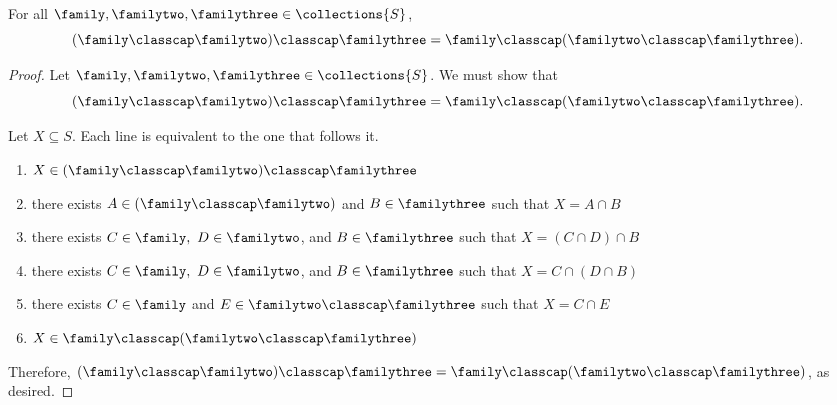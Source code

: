 \begin{theorem}
    \label{thm_classcap_associative}
    For all $\family, \familytwo, \familythree \in \collections{S}$,
    \[(\family \classcap \familytwo) \classcap \familythree = \family \classcap (\familytwo \classcap \familythree).\]
\end{theorem}

\begin{proof}
     Let $\family, \familytwo, \familythree \in \collections{S}$.  We must show that
    \[(\family \classcap \familytwo) \classcap \familythree = \family \classcap (\familytwo \classcap \familythree).\]


    Let $X \subseteq S$. Each line is equivalent to the one that follows it.
    \begin{enumerate}
        \item $X \in (\family \classcap \familytwo) \classcap \familythree$
        \item there exists $A \in (\family \classcap \familytwo)$ and $B \in \familythree$ such that $X = A \cap B$
        \item there exists $C \in \family, \ D \in \familytwo$, and $B \in \familythree$ such that $X = (C \cap D) \cap B$
        \item there exists $C \in \family, \ D \in \familytwo$, and $B \in \familythree$ such that $X = C \cap (D \cap B)$
        \item there exists $C \in \family$ and $E \in \familytwo \classcap \familythree$ such that $X = C \cap E$
        \item $X \in \family \classcap (\familytwo \classcap \familythree)$
    \end{enumerate}
    Therefore, $(\family \classcap \familytwo) \classcap \familythree = \family \classcap (\familytwo \classcap \familythree)$, as desired.
\end{proof}

